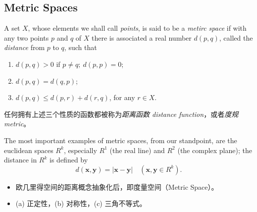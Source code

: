\documentclass[../poma-notes.tex]{subfiles}
\begin{document}
\subsection*{Metric Spaces}

\begin{definition}
  A set $X$, whose elements we shall call \textit{points}, is said to be a \textit{metirc space} if with any two points
  $p$ and $q$ of $X$ there is associated a real number $d(p,q)$, called the \textit{distance} from $p$ to $q$, such that
  \begin{enumerate}[label=(\alph*)]
    \item $d(p,q)>0$ if $p \ne q; \ d(p, p) = 0$;
    \item $d(p,q) = d(q,p)$;
    \item $d(p,q) \le d(p,r) + d(r,q)$, for any $r \in X$.
  \end{enumerate}
\end{definition}

任何拥有上述三个性质的函数都被称为\textit{距离函数 distance function}，或者\textit{度规 metric}。

\begin{example}
  The most important examples of metric spaces, from our standpoint, are the euclidean spaces $R^k$, especially $R^1$
  (the real line) and $R^2$ (the complex plane); the distance in $R^k$ is defined by
  \begin{equation}
    d(\mathbf{x}, \mathbf{y}) = |\mathbf{x} - \mathbf{y}| \quad (\mathbf{x},\mathbf{y} \in R^k).
  \end{equation}
\end{example}

\begin{anote}
  \begin{itemize}
    \item 欧几里得空间的距离概念抽象化后，即度量空间（Metric Space）。
    \item (a) 正定性，(b) 对称性，(c) 三角不等式。
  \end{itemize}
\end{anote}
\end{document}

